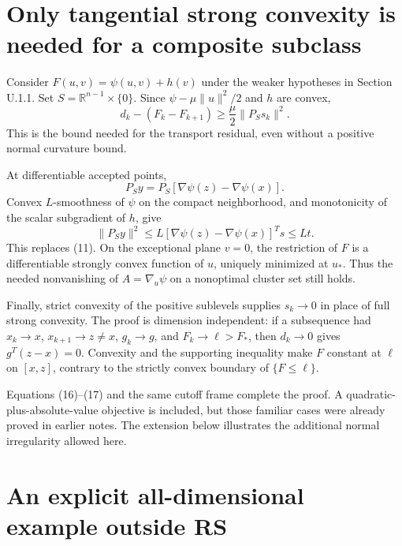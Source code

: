 \setcounter{section}{5}
\setcounter{theorem}{0}
\setcounter{lemma}{0}
\setcounter{corollary}{0}
\setcounter{proposition}{0}
\setcounter{remark}{0}
\setcounter{equation}{0}
\section{Only tangential strong convexity is needed for a composite
subclass}\label{U:only-tangential-strong-convexity-is-needed-for-a-composite-subclass}

Consider \(F(u,v)=\psi(u,v)+h(v)\) under the weaker hypotheses in
Section U.1.1. Set \(S=\mathbb R^{n-1}\times\{0\}\). Since
\(\psi-\mu\|u\|^2/2\) and \(h\) are convex, \[
 d_k-(F_k-F_{k+1})\ge\frac\mu2\|P_Ss_k\|^2.\tag{U.16}
\] This is the bound needed for the transport residual, even without a
positive normal curvature bound.

At differentiable accepted points, \[
 P_Sy=P_S[\nabla\psi(z)-\nabla\psi(x)].
\] Convex \(L\)-smoothness of \(\psi\) on the compact neighborhood, and
monotonicity of the scalar subgradient of \(h\), give \[
 \|P_Sy\|^2
 \le L[\nabla\psi(z)-\nabla\psi(x)]^Ts
 \le Lt.\tag{U.17}
\] This replaces (11). On the exceptional plane \(v=0\), the restriction
of \(F\) is a differentiable strongly convex function of \(u\), uniquely
minimized at \(u_*\). Thus the needed nonvanishing of \(A=\nabla_u\psi\)
on a nonoptimal cluster set still holds.

Finally, strict convexity of the positive sublevels supplies \(s_k\to0\)
in place of full strong convexity. The proof is dimension independent:
if a subsequence had \(x_k\to x\), \(x_{k+1}\to z\ne x\), \(g_k\to g\),
and \(F_k\to\ell>F_*\), then \(d_k\to0\) gives \(g^T(z-x)=0\). Convexity
and the supporting inequality make \(F\) constant at \(\ell\) on
\([x,z]\), contrary to the strictly convex boundary of \(\{F\le\ell\}\).

Equations (16)--(17) and the same cutoff frame complete the proof. A
quadratic-plus-absolute-value objective is included, but those familiar
cases were already proved in earlier notes. The extension below
illustrates the additional normal irregularity allowed here.


\setcounter{section}{6}
\setcounter{theorem}{0}
\setcounter{lemma}{0}
\setcounter{corollary}{0}
\setcounter{proposition}{0}
\setcounter{remark}{0}
\setcounter{equation}{0}
\section{An explicit all-dimensional example outside
RS}\label{U:an-explicit-all-dimensional-example-outside-rs}

